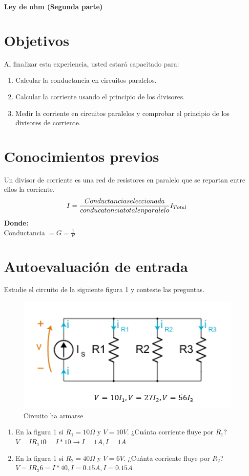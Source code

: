\thispagestyle{fancy}
\begin{center}
	\LARGE{\textbf{Ley de ohm (Segunda parte)}}
\end{center}
\section{Objetivos}
Al finalizar esta experiencia, usted estará capacitado para:
\begin{enumerate}
	\item Calcular la conductancia en circuitos paralelos.
	\item Calcular la corriente usando el principio de los divisores.
	\item Medir la corriente en circuitos paralelos y comprobar el principio de los divisores de corriente.
\end{enumerate}
\section{Conocimientos previos}
Un divisor de corriente es una red de resistores en paralelo que se repartan entre ellos la corriente.
\begin{equation*}
	\centering
	I = \frac{ Conductancia seleccionada }{ conducatancia total en paralelo}I_{Total}
\end{equation*}
\textbf{Donde:}
\\ Conductancia $= G = \frac{1}{R}$
\section{Autoevaluación de entrada}
Estudie el circuito de la siguiente figura 1 y  conteste las preguntas.
\begin{figure}[h]
	\centering
	\includegraphics[scale=0.5]{imagenes/1}
	\caption{Circuito ha armarse}
\end{figure}
\begin{enumerate}
	\item En la figura 1 si $R_{1} =10\Omega$ y $V=10V$. ¿Cuánta corriente fluye por $R_{1}$?\\ $ V=IR_{1}
	10=I*10→I=1A , I=1A$
	
	\item En la figura 1 si $R_{2} =40\Omega$ y $V=6V$. ¿Cuánta corriente fluye por $R_{2}$?\\ $V=IR_{2}
	6=I*40, I=0.15A, I=0.15A$
	
\end{enumerate}

